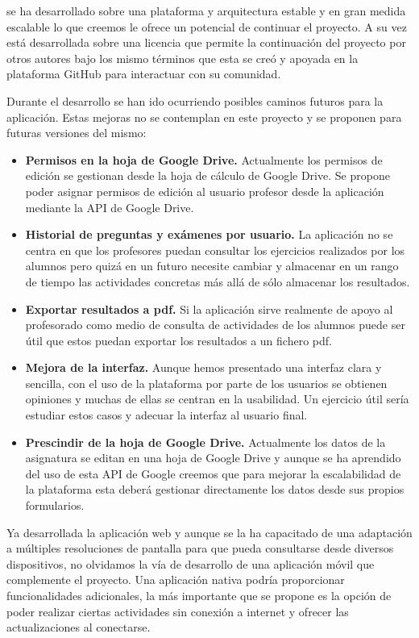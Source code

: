 \bigskip
{\titulo} se ha desarrollado sobre una plataforma y arquitectura estable y en gran medida escalable lo que creemos le ofrece un potencial de continuar el proyecto. A su vez está desarrollada sobre una licencia que permite la continuación del proyecto por otros autores bajo los mismo términos que esta se creó y apoyada en la plataforma GitHub para interactuar con su comunidad.

\bigskip
Durante el desarrollo se han ido ocurriendo posibles caminos futuros para la aplicación. Estas mejoras no se contemplan en este proyecto y se proponen para futuras versiones del mismo:

 \begin{itemize}
    \item \textbf{Permisos en la hoja de Google Drive.} Actualmente los permisos de edición se gestionan desde la hoja de cálculo de Google Drive. Se propone poder asignar permisos de edición al usuario profesor desde la aplicación mediante la API de Google Drive.

    \item \textbf{Historial de preguntas y exámenes por usuario.} La aplicación no se centra en que los profesores puedan consultar los ejercicios realizados por los alumnos pero quizá en un futuro necesite cambiar y almacenar en un rango de tiempo las actividades concretas más allá de sólo almacenar los resultados.

    \item \textbf{Exportar resultados a pdf.} Si la aplicación sirve realmente de apoyo al profesorado como medio de consulta de actividades de los alumnos puede ser útil que estos puedan exportar los resultados a un fichero pdf.

    \item \textbf{Mejora de la interfaz.} Aunque hemos presentado una interfaz clara y sencilla, con el uso de la plataforma por parte de los usuarios se obtienen opiniones y muchas de ellas se centran en la usabilidad. Un ejercicio útil sería estudiar estos casos y adecuar la interfaz al usuario final.

    \item \textbf{Prescindir de la hoja de Google Drive.} Actualmente los datos de la asignatura se editan en una hoja de Google Drive y aunque se ha aprendido del uso de esta API de Google creemos que para mejorar la escalabilidad de la plataforma esta deberá gestionar directamente los datos desde sus propios formularios.
 \end{itemize}


\bigskip
	Ya desarrollada la aplicación web y aunque se la ha capacitado de una adaptación a múltiples resoluciones de pantalla para que pueda consultarse desde diversos dispositivos, no olvidamos la vía de desarrollo de una aplicación móvil que complemente el proyecto. Una aplicación nativa podría proporcionar funcionalidades adicionales, la más importante que se propone es la opción de poder realizar ciertas actividades sin conexión a internet y ofrecer las actualizaciones al conectarse.
